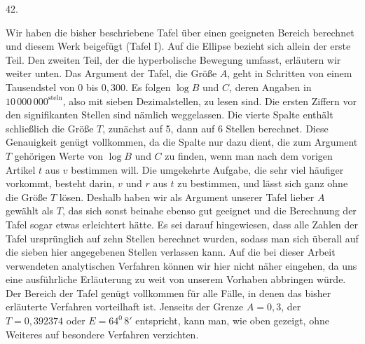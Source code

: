 \begin{center}
42.
\end{center}
Wir haben die bisher beschriebene Tafel über einen geeigneten Bereich berechnet und diesem Werk beigefügt (Tafel I). Auf die Ellipse bezieht sich allein der erste Teil. Den zweiten Teil, der die hyperbolische Bewegung umfasst, erläutern wir weiter unten. Das Argument der Tafel, die Größe $A$, geht in Schritten von einem Tausendstel von $0$ bis $0{,}300$. Es folgen $\log B$ und $C$, deren Angaben in $10\,000\,000^{\mathrm{steln}}$, also mit sieben Dezimalstellen, zu lesen sind. Die ersten Ziffern vor den signifikanten Stellen sind nämlich weggelassen. Die vierte Spalte enthält schließlich die Größe $T$, zunächst auf 5, dann auf 6 Stellen berechnet. Diese Genauigkeit genügt vollkommen, da die Spalte nur dazu dient, die zum Argument $T$ gehörigen Werte von $\log B$ und $C$ zu finden, wenn man nach dem vorigen Artikel $t$ aus $v$ bestimmen will. Die umgekehrte Aufgabe, die sehr viel häufiger vorkommt, besteht darin, $v$ und $r$ aus $t$ zu bestimmen, und lässt sich ganz ohne die Größe $T$ lösen. Deshalb haben wir als Argument unserer Tafel lieber $A$ gewählt als $T$, das sich sonst beinahe ebenso gut geeignet und die Berechnung der Tafel sogar etwas erleichtert hätte. Es sei darauf hingewiesen, dass alle Zahlen der Tafel ursprünglich auf zehn Stellen berechnet wurden, sodass man sich überall auf die sieben hier angegebenen Stellen verlassen kann. Auf die bei dieser Arbeit verwendeten analytischen Verfahren können wir hier nicht näher eingehen, da uns eine ausführliche Erläuterung zu weit von unserem Vorhaben abbringen würde. Der Bereich der Tafel genügt vollkommen für alle Fälle, in denen das bisher erläuterte Verfahren vorteilhaft ist. Jenseits der Grenze $A=0{,}3$, der $T=0{,}392374$ oder $E=64^0\,8'$ entspricht, kann man, wie oben gezeigt, ohne Weiteres auf besondere Verfahren verzichten.
